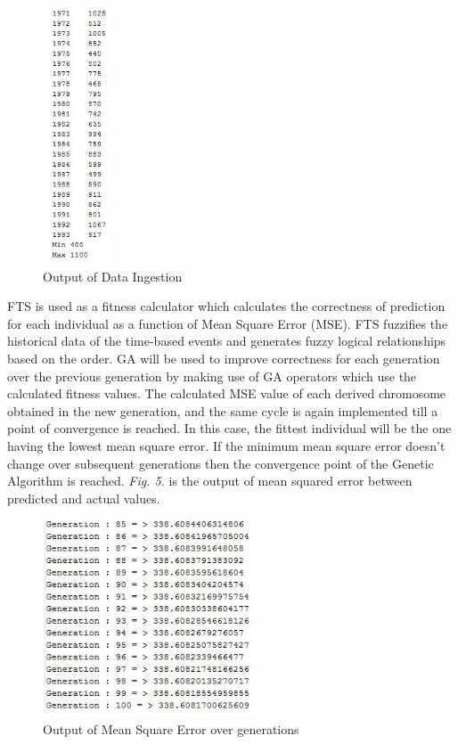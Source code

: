 \documentclass[12pt,journal,compsoc]{IEEEtran}
\begin{document}
\begin{figure}
\includegraphics[height=3in]{parseddata}
\caption{Output of Data Ingestion}
\label{parseddata}
\end{figure}
	 	 	
\indent FTS is used as a fitness calculator which calculates the correctness of prediction for each individual as a function of Mean Square Error (MSE). FTS fuzzifies the historical data of the time-based events and generates fuzzy logical relationships based on the order. GA will be used to improve correctness for each generation over the previous generation by making use of GA operators which use the calculated fitness values. The calculated MSE value of each derived chromosome obtained in the new generation, and the same cycle is again implemented till a point of convergence is reached. In this case, the fittest individual will be the one having the lowest mean square error. If the minimum mean square error doesn’t change over subsequent generations then the convergence point of the Genetic Algorithm is reached. \emph{Fig. 5.} is the output of mean squared error between predicted and actual values. 

\begin{figure}
\includegraphics[width=2.5in]{genop}
\caption{Output of Mean Square Error over generations}
\end{figure}
\end{document}
